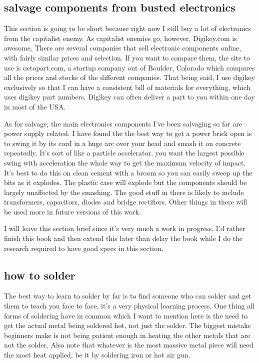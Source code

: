 \subsection{salvage components from busted
electronics}\label{salvage-components-from-busted-electronics}

This section is going to be short because right now I still buy a lot of
electronics from the capitalist enemy. As capitalist enemies go,
however, Digikey.com is awesome. There are several companies that sell
electronic components online, with fairly similar prices and selection.
If you want to compare them, the site to use is octopart.com, a startup
company out of Boulder, Colorado which compares all the prices and
stocks of the different companies. That being said, I use digikey
exclusively so that I can have a consistent bill of materials for
everything, which uses digikey part numbers. Digikey can often deliver a
part to you within one day in most of the USA.

As for salvage, the main electronics components I've been salvaging so
far are power supply related. I have found the the best way to get a
power brick open is to swing it by its cord in a huge arc over your head
and smash it on concrete repeatedly. It's sort of like a particle
accelerator, you want the largest possible swing with acceleration the
whole way to get the maximum velocity of impact. It's best to do this on
clean cement with a broom so you can easily sweep up the bits as it
explodes. The plastic case will explode but the components should be
largely unaffected by the smashing. The good stuff in there is likely to
include transformers, capacitors, diodes and bridge rectifiers. Other
things in there will be used more in future versions of this work.

I will leave this section brief since it's very much a work in progress.
I'd rather finish this book and then extend this later than delay the
book while I do the research required to have good specs in this
section.

\subsection{how to solder}\label{how-to-solder}

The best way to learn to solder by far is to find someone who can solder
and get them to teach you face to face, it's a very physical learning
process. One thing all forms of soldering have in common which I want to
mention here is the need to get the actual metal being soldered hot, not
just the solder. The biggest mistake beginners make is not being patient
enough in heating the other metals that are not the solder. Also note
that whatever is the most massive metal piece will need the most heat
applied, be it by soldering iron or hot air gun.

